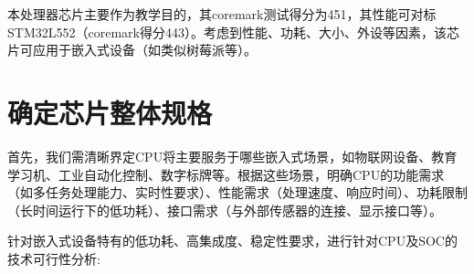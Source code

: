 本处理器芯片主要作为教学目的，其coremark测试得分为451，其性能可对标STM32L552（coremark得分443）。考虑到性能、功耗、大小、外设等因素，该芯片可应用于嵌入式设备（如类似树莓派等）。

\section{确定芯片整体规格}\label{sec:08-verification-and-implementation-002}

首先，我们需清晰界定CPU将主要服务于哪些嵌入式场景，如物联网设备、教育学习机、工业自动化控制、数字标牌等。根据这些场景，明确CPU的功能需求（如多任务处理能力、实时性要求）、性能需求（处理速度、响应时间）、功耗限制（长时间运行下的低功耗）、接口需求（与外部传感器的连接、显示接口等）。

针对嵌入式设备特有的低功耗、高集成度、稳定性要求，进行针对CPU及SOC的技术可行性分析:

